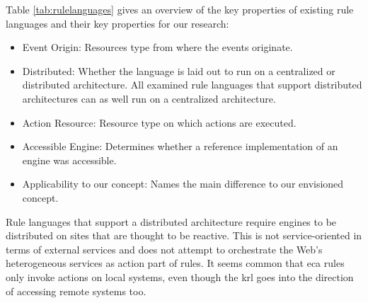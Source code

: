 Table \ref{tab:rulelanguages} gives an overview of the key properties of existing rule languages and their key properties for our research:
\begin{itemize}
  \item \textrm{Event Origin}: Resources type from where the events originate.
  \item \textrm{Distributed}: Whether the language is laid out to run on a centralized or distributed architecture. All examined rule languages that support distributed architectures can as well run on a centralized architecture.
  \item \textrm{Action Resource}: Resource type on which actions are executed.
  \item \textrm{Accessible Engine}: Determines whether a reference implementation of an engine was accessible.
  \item \textrm{Applicability to our concept}: Names the main difference to our envisioned concept.
\end{itemize}
Rule languages that support a distributed architecture require engines to be distributed on sites that are thought to be reactive.
This is not service-oriented in terms of external services and does not attempt to orchestrate the Web's heterogeneous services as action part of rules.
It seems common that \textrm{\acrshort{eca}} rules only invoke actions on local systems, even though the \textrm{\acrshort{krl}} goes into the direction of accessing remote systems too.


